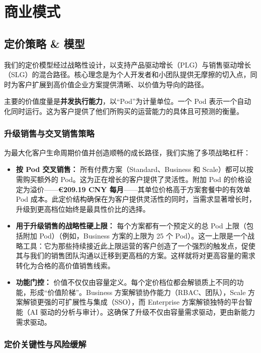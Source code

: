 \documentclass[11pt, a4paper, oneside]{article}
\begin{document}
\section{商业模式}
\subsection{定价策略 \& 模型}
我们的定价模型经过战略性设计，以支持产品驱动增长（PLG）与销售驱动增长（SLG）的混合路径。核心理念是为个人开发者和小团队提供无摩擦的切入点，同时为客户扩展到高价值企业方案提供清晰、以价值为导向的路径。

主要的价值度量是\textbf{并发执行能力}，以“Pod”为计量单位。一个 Pod 表示一个自动化同时运行。这为客户提供了他们所购买的运营能力的具体且可预测的衡量。

\subsubsection{升级销售与交叉销售策略}

为最大化客户生命周期价值并创造顺畅的成长路径，我们实施了多项战略杠杆：

\begin{itemize}
    \item \textbf{按 Pod 交叉销售：} 所有付费方案（Standard、Business 和 Scale）都可以按需购买额外的 Pod。这为正在增长的客户提供了灵活性。附加 Pod 的价格设定为溢价——\textbf{\euro{209.19 CNY} 每月}——其单位价格高于方案套餐中的有效单 Pod 成本。此定价结构确保在为客户提供灵活性的同时，当需求显著增长时，升级到更高档位始终是最具性价比的选择。

    \item \textbf{用于升级销售的战略性硬上限：} 每个方案都有一个预定义的总 Pod 上限（包括附加 Pod）（例如，Business 方案的上限为 25 个 Pod）。这一上限是一个战略工具：它为那些持续接近此上限运营的客户创造了一个强烈的触发点，促使其与我们的销售团队沟通以迁移到更高档的方案。这样就将对更高容量的需求转化为合格的高价值销售线索。

    \item \textbf{功能门控：} 价值不仅仅由容量定义。每个定价档位都会解锁质上不同的功能，形成“价值阶梯”。Business 方案解锁协作能力（RBAC、团队），Scale 方案解锁更强的可扩展性与集成（SSO），而 Enterprise 方案解锁独特的平台智能（AI 驱动的分析与审计）。这确保了升级不仅由容量需求驱动，更由新能力需求驱动。
\end{itemize}

\subsubsection{定价关键性与风险缓解}
\end{document}
